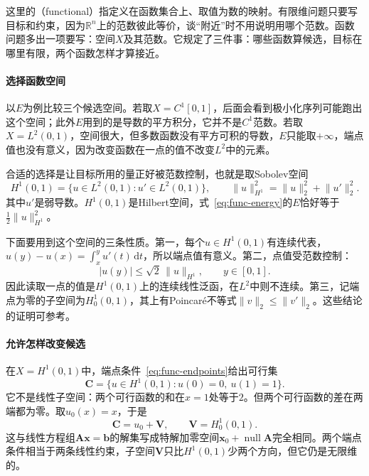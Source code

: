 这里的（functional）指定义在函数集合上、取值为数的映射。有限维问题只要写目标和约束，因为$\mathbb{R}^n$上的范数彼此等价，谈“附近”时不用说明用哪个范数。函数问题多出一项要写：空间$X$及其范数。它规定了三件事：哪些函数算候选，目标在哪里有限，两个函数怎样才算接近。

\paragraph{选择函数空间}
以$E$为例比较三个候选空间。若取$X=C^1[0,1]$，后面会看到极小化序列可能跑出这个空间；此外$E$用到的是导数的平方积分，它并不是$C^1$范数。若取$X=L^2(0,1)$，空间很大，但多数函数没有平方可积的导数，$E$只能取$+\infty$，端点值也没有意义，因为改变函数在一点的值不改变$L^2$中的元素。

合适的选择是让目标所用的量正好被范数控制，也就是取Sobolev空间
\begin{equation}
 H^1(0,1)=\bigl\{u\in L^2(0,1):u'\in L^2(0,1)\bigr\},\qquad
 \lVert u\rVert_{H^1}^2=\lVert u\rVert_2^2+\lVert u'\rVert_2^2.
 \label{eq:func-h1}
\end{equation}
其中$u'$是弱导数。$H^1(0,1)$是Hilbert空间，式~\eqref{eq:func-energy}的$E$恰好等于$\frac12\lVert u\rVert_{H^1}^2$。

下面要用到这个空间的三条性质。第一，每个$u\in H^1(0,1)$有连续代表，$u(y)-u(x)=\int_x^yu'(t)\,\mathrm{d}t$，所以端点值有意义。第二，点值受范数控制：
\begin{equation}
 \lvert u(y)\rvert\leq\sqrt2\,\lVert u\rVert_{H^1},\qquad y\in[0,1].
 \label{eq:func-point-bound}
\end{equation}
因此读取一点的值是$H^1(0,1)$上的连续线性泛函，在$L^2$中则不连续。第三，记端点为零的子空间为$H^1_0(0,1)$，其上有Poincaré不等式$\lVert v\rVert_2\leq\lVert v'\rVert_2$。这些结论的证明可参考。

\paragraph{允许怎样改变候选}
在$X=H^1(0,1)$中，端点条件~\eqref{eq:func-endpoints}给出可行集
\begin{equation}
 \bm{C}=\bigl\{u\in H^1(0,1):u(0)=0,\ u(1)=1\bigr\}.
 \label{eq:func-feasible}
\end{equation}
它不是线性子空间：两个可行函数的和在$x=1$处等于$2$。但两个可行函数的差在两端都为零。取$u_0(x)=x$，于是
\begin{equation}
 \bm{C}=u_0+\bm{V},\qquad \bm{V}=H^1_0(0,1).
 \label{eq:func-affine}
\end{equation}
这与线性方程组$\bm{A}\bm{x}=\bm{b}$的解集写成特解加零空间$\bm{x}_0+\operatorname{null}\bm{A}$完全相同。两个端点条件相当于两条线性约束，子空间$\bm{V}$只比$H^1(0,1)$少两个方向，但它仍是无限维的。

